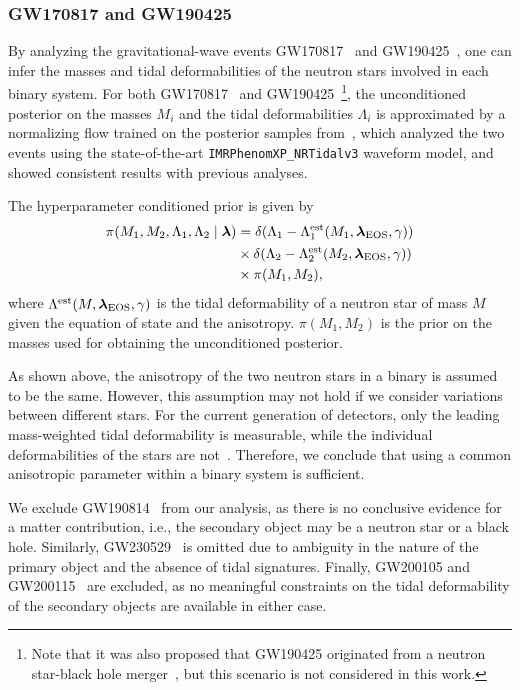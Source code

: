 \documentclass[prd,twocolumn,a4paper,floatfix,nofootinbib,preprintnumbers,superscriptaddress]{revtex4-1}
\begin{document}
\subsubsection{GW170817 and GW190425}
By analyzing the gravitational-wave events GW170817~\cite{LIGOScientific:2017vwq} and GW190425~\cite{LIGOScientific:2020aai}, one can infer the masses and tidal deformabilities of the neutron stars involved in each binary system. For both GW170817~\cite{LIGOScientific:2017vwq} and GW190425~\cite{LIGOScientific:2020aai}\footnote{Note that it was also proposed that GW190425 originated from a neutron star-black hole merger~\cite{Foley:2020kus, Han:2020qmn, Kyutoku:2020xka}, but this scenario is not considered in this work.}, the unconditioned posterior on the masses $M_i$ and the tidal deformabilities $\Lambda_i$ is approximated by a normalizing flow trained on the posterior samples from~\cite{Abac:2023ujg}, which analyzed the two events using the state-of-the-art \texttt{IMRPhenomXP\_NRTidalv3} waveform model, and showed consistent results with previous analyses.

The hyperparameter conditioned prior is given by
\begin{equation}
\begin{aligned}
    \pi(M_1, M_2, \Lambda_1, \Lambda_2 \mid \boldsymbol{\lambda}) &= \delta(\Lambda_1 - \Lambda_1^{\rm est}(M_1, \boldsymbol{\lambda}_{\rm EOS}, \gamma))\\
    &\times\delta(\Lambda_2 - \Lambda_2^{\rm est}(M_2, \boldsymbol{\lambda}_{\rm EOS}, \gamma))\\
    &\times\pi(M_1,M_2),
\end{aligned}
\end{equation}
where $\Lambda^{\rm est}(M, \boldsymbol{\lambda}_{\rm EOS}, \gamma)$ is the tidal deformability of a neutron star of mass $M$ given the equation of state and the anisotropy. $\pi(M_1, M_2)$ is the prior on the masses used for obtaining the unconditioned posterior.

As shown above, the anisotropy of the two neutron stars in a binary is assumed to be the same. However, this assumption may not hold if we consider variations between different stars. For the current generation of detectors, only the leading mass-weighted tidal deformability is measurable, while the individual deformabilities of the stars are not~\cite{Wade:2014vqa}. Therefore, we conclude that using a common anisotropic parameter within a binary system is sufficient.

We exclude GW190814~\cite{LIGOScientific:2020zkf} from our analysis, as there is no conclusive evidence for a matter contribution, i.e., the secondary object may be a neutron star or a black hole. Similarly, GW230529~\cite{LIGOScientific:2024elc} is omitted due to ambiguity in the nature of the primary object and the absence of tidal signatures. Finally, GW200105 and GW200115~\cite{LIGOScientific:2021qlt} are excluded, as no meaningful constraints on the tidal deformability of the secondary objects are available in either case.
\end{document}

